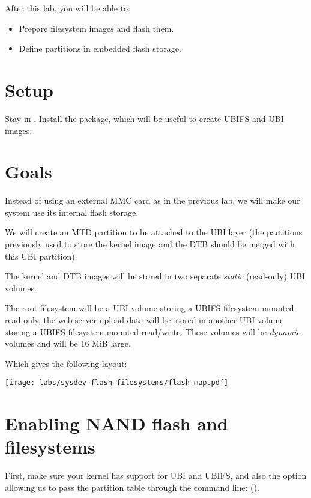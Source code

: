 
After this lab, you will be able to:
\begin{itemize}
\item Prepare filesystem images and flash them.
\item Define partitions in embedded flash storage.
\end{itemize}

\section{Setup}

Stay in . Install the
 package, which will be useful to create UBIFS and
UBI images.

\section{Goals}

Instead of using an external MMC card as in the previous lab, we will
make our system use its internal flash storage.

We will create an MTD partition to be attached to the UBI layer (the partitions
previously used to store the kernel image and the DTB should be merged
with this UBI partition).

The kernel and DTB images will be stored in two separate {\em static}
(read-only) UBI volumes.

The root filesystem will be a UBI volume storing a UBIFS filesystem
mounted read-only, the web server upload data will be stored in
another UBI volume storing a UBIFS filesystem mounted
read/write. These volumes will be {\em dynamic} volumes and will be
16 MiB large.

Which gives the following layout:

\begin{center}
  \texttt{[image: labs/sysdev-flash-filesystems/flash-map.pdf]}
\end{center}

\section{Enabling NAND flash and filesystems}

First, make sure your kernel has support for UBI and UBIFS, and also
the option allowing us to pass the partition table through the command
line:
().

